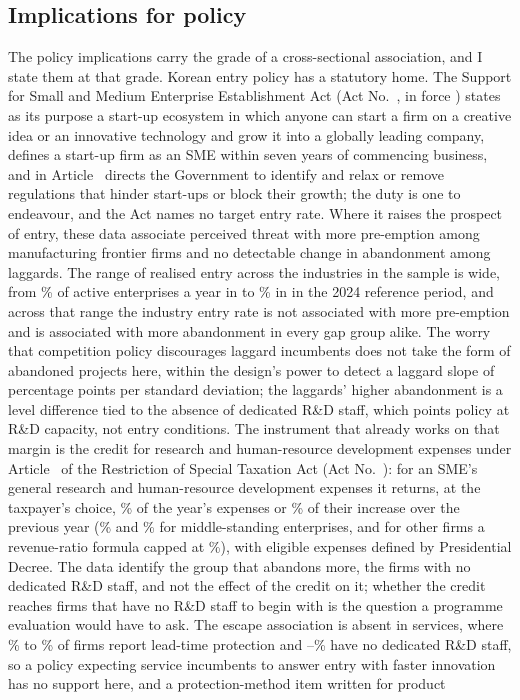 \documentclass[preprint,12pt,authoryear]{elsarticle}
\begin{document}
\subsection{Implications for policy}

The policy implications carry the grade of a cross-sectional association, and I state them at that grade. Korean entry policy has a statutory home. The Support for Small and Medium Enterprise Establishment Act (Act No.~\LawSMESAActNo, in force \LawSMESAEffective) states as its purpose a start-up ecosystem in which anyone can start a firm on a creative idea or an innovative technology and grow it into a globally leading company, defines a start-up firm as an SME within seven years of commencing business, and in Article~\LawSMESARegArticle{} directs the Government to identify and relax or remove regulations that hinder start-ups or block their growth; the duty is one to endeavour, and the Act names no target entry rate. Where it raises the prospect of entry, these data associate perceived threat with more pre-emption among manufacturing frontier firms and no detectable change in abandonment among laggards. The range of realised entry across the industries in the sample is wide, from \EntryMinIndTwoZeroTwoFourMPct\% of active enterprises a year in \EntryMinIndTwoZeroTwoFourMLabel{} to \EntryMaxIndTwoZeroTwoFourMPct\% in \EntryMaxIndTwoZeroTwoFourMLabel{} in the 2024 reference period, and across that range the industry entry rate is not associated with more pre-emption and is associated with more abandonment in every gap group alike. The worry that competition policy discourages laggard incumbents does not take the form of abandoned projects here, within the design's power to detect a laggard slope of \MDEQuitPp{} percentage points per standard deviation; the laggards' higher abandonment is a level difference tied to the absence of dedicated R\&D staff, which points policy at R\&D capacity, not entry conditions. The instrument that already works on that margin is the credit for research and human-resource development expenses under Article~\LawRSTAArticle{} of the Restriction of Special Taxation Act (Act No.~\LawRSTAActNo): for an SME's general research and human-resource development expenses it returns, at the taxpayer's choice, \LawRSTASMECurrentPct\% of the year's expenses or \LawRSTASMEIncrementPct\% of their increase over the previous year (\LawRSTAMidCurrentPct\% and \LawRSTAMidIncrementPct\% for middle-standing enterprises, and for other firms a revenue-ratio formula capped at \LawRSTALargeCapPct\%), with eligible expenses defined by Presidential Decree. The data identify the group that abandons more, the \GapZeroN{} firms with no dedicated R\&D staff, and not the effect of the credit on it; whether the credit reaches firms that have no R\&D staff to begin with is the question a programme evaluation would have to ask. The escape association is absent in services, where \PreemptRateTwoZeroTwoFiveSPct\% to \PreemptRateTwoZeroTwoThreeSPct\% of firms report lead-time protection and \ShareZeroRDServMinPct--\ShareZeroRDServMaxPct\% have no dedicated R\&D staff, so a policy expecting service incumbents to answer entry with faster innovation has no support here, and a protection-method item written for product 
\end{document}
